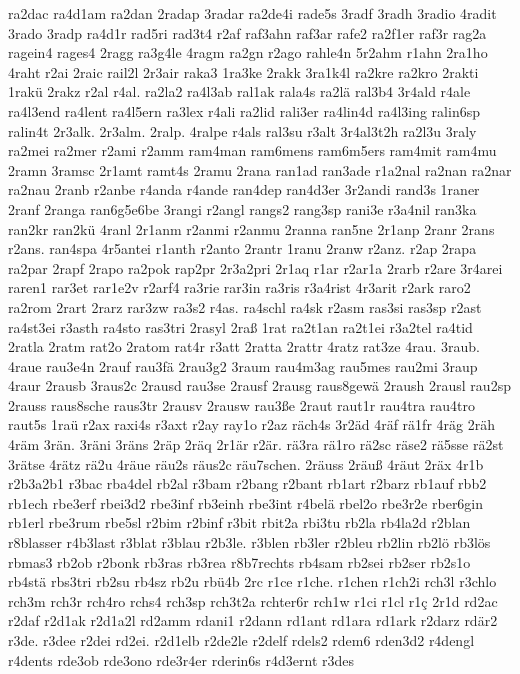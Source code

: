 {ra2dac
ra4d1am
ra2dan
2radap
3radar
ra2de4i
rade5s
3radf
3radh
3radio
4radit
3rado
3radp
ra4d1r
rad5ri
rad3t4
r2af
raf3ahn
raf3ar
rafe2
ra2f1er
raf3r
rag2a
ragein4
rages4
2ragg
ra3g4le
4ragm
ra2gn
r2ago
rahle4n
5r2ahm
r1ahn
2ra1ho
4raht
r2ai
2raic
rail2l
2r3air
raka3
1ra3ke
2rakk
3ra1k4l
ra2kre
ra2kro
2rakti
1rakü
2rakz
r2al
r4al.
ra2la2
ra4l3ab
ral1ak
rala4s
ra2lä
ral3b4
3r4ald
r4ale
ra4l3end
ra4lent
ra4l5ern
ra3lex
r4ali
ra2lid
rali3er
ra4lin4d
ra4l3ing
ralin6sp
ralin4t
2r3alk.
2r3alm.
2ralp.
4ralpe
r4als
ral3su
r3alt
3r4al3t2h
ra2l3u
3raly
ra2mei
ra2mer
r2ami
r2amm
ram4man
ram6mens
ram6m5ers
ram4mit
ram4mu
2ramn
3ramsc
2r1amt
ramt4s
2ramu
2rana
ran1ad
ran3ade
r1a2nal
ra2nan
ra2nar
ra2nau
2ranb
r2anbe
r4anda
r4ande
ran4dep
ran4d3er
3r2andi
rand3s
1raner
2ranf
2ranga
ran6g5e6be
3rangi
r2angl
rangs2
rang3sp
rani3e
r3a4nil
ran3ka
ran2kr
ran2kü
4ranl
2r1anm
r2anmi
r2anmu
2ranna
ran5ne
2r1anp
2ranr
2rans
r2ans.
ran4spa
4r5antei
r1anth
r2anto
2rantr
1ranu
2ranw
r2anz.
r2ap
2rapa
ra2par
2rapf
2rapo
ra2pok
rap2pr
2r3a2pri
2r1aq
r1ar
r2ar1a
2rarb
r2are
3r4arei
raren1
rar3et
rar1e2v
r2arf4
ra3rie
rar3in
ra3ris
r3a4rist
4r3arit
r2ark
raro2
ra2rom
2rart
2rarz
rar3zw
ra3s2
r4as.
ra4schl
ra4sk
r2asm
ras3si
ras3sp
r2ast
ra4st3ei
r3asth
ra4sto
ras3tri
2rasyl
2raß
1rat
ra2t1an
ra2t1ei
r3a2tel
ra4tid
2ratla
2ratm
rat2o
2ratom
rat4r
r3att
2ratta
2rattr
4ratz
rat3ze
4rau.
3raub.
4raue
rau3e4n
2rauf
rau3fä
2rau3g2
3raum
rau4m3ag
rau5mes
rau2mi
3raup
4raur
2rausb
3raus2c
2rausd
rau3se
2rausf
2rausg
raus8gewä
2raush
2rausl
rau2sp
2rauss
raus8sche
raus3tr
2rausv
2rausw
rau3ße
2raut
raut1r
rau4tra
rau4tro
raut5s
1raü
r2ax
raxi4s
r3axt
r2ay
ray1o
r2az
räch4s
3r2äd
4räf
rä1fr
4räg
2räh
4räm
3rän.
3räni
3räns
2räp
2räq
2r1är
r2är.
rä3ra
rä1ro
rä2sc
räse2
rä5sse
rä2st
3rätse
4rätz
rä2u
4räue
räu2s
räus2c
räu7schen.
2räuss
2räuß
4räut
2räx
4r1b
r2b3a2b1
r3bac
rba4del
rb2al
r3bam
r2bang
r2bant
rb1art
r2barz
rb1auf
rbb2
rb1ech
rbe3erf
rbei3d2
rbe3inf
rb3einh
rbe3int
r4belä
rbel2o
rbe3r2e
rber6gin
rb1erl
rbe3rum
rbe5sl
r2bim
r2binf
r3bit
rbit2a
rbi3tu
rb2la
rb4la2d
r2blan
r8blasser
r4b3last
r3blat
r3blau
r2b3le.
r3blen
rb3ler
r2bleu
rb2lin
rb2lö
rb3lös
rbmas3
rb2ob
r2bonk
rb3ras
rb3rea
r8b7rechts
rb4sam
rb2sei
rb2ser
rb2s1o
rb4stä
rbs3tri
rb2su
rb4sz
rb2u
rbü4b
2rc
r1ce
r1che.
r1chen
r1ch2i
rch3l
r3chlo
rch3m
rch3r
rch4ro
rchs4
rch3sp
rch3t2a
rchter6r
rch1w
r1ci
r1cl
r1ç
2r1d
rd2ac
r2daf
r2d1ak
r2d1a2l
rd2amm
rdani1
r2dann
rd1ant
rd1ara
rd1ark
r2darz
rdär2
r3de.
r3dee
r2dei
rd2ei.
r2d1elb
r2de2le
r2delf
rdels2
rdem6
rden3d2
r4dengl
r4dents
rde3ob
rde3ono
rde3r4er
rderin6s
r4d3ernt
r3des
}
